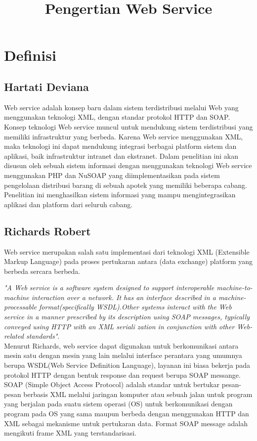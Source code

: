 \documentclass[12pt]{journal}
\begin{document}
\title{Pengertian Web Service}
\maketitle

\section{Definisi}

\subsection{Hartati Deviana}
	Web service adalah konsep baru dalam sistem terdistribusi melalui Web yang menggunakan teknologi XML, dengan standar protokol  HTTP dan SOAP. Konsep teknologi Web service muncul untuk mendukung sistem terdistribusi yang memiliki infrastruktur yang berbeda. Karena Web service menggunakan XML, maka teknologi ini dapat mendukung integrasi berbagai platform sistem dan aplikasi, baik infrastruktur intranet dan ekstranet. Dalam penelitian ini akan disusun oleh sebuah sistem informasi dengan menggunakan teknologi Web service menggunakan PHP dan NuSOAP yang diimplementasikan pada sistem pengelolaan distribusi barang di sebuah apotek yang memiliki beberapa cabang. Penelitian ini menghasilkan sistem informasi yang mampu mengintegrasikan aplikasi dan platform dari seluruh cabang\cite{deviana2013penerapan}.

\subsection{Richards Robert}

Web service merupakan salah satu implementasi dari teknologi XML (Extensible Markup Language) pada proses pertukaran antara (data exchange) platform yang berbeda sercara berbeda.

\textit{"A Web service is a software system designed to support interoperable machine-to-machine interaction over a network. It has an interface described in a machine-processable format(specifically WSDL).Other systems interact with the Web service in a manner prescribed by its description using SOAP messages, typically conveyed using HTTP with an XML seriali zation in conjunction with other Web-related standards"}.\\

Menurut Richards, web service dapat digunakan untuk berkomunikasi antara mesin satu dengan mesin yang lain melalui interface perantara yang umumnya berupa WSDL(Web Service Definition Language), layanan ini biasa bekerja pada protokol HTTP dengan bentuk response dan request berupa SOAP messange. SOAP (Simple Object Access Protocol) adalah standar untuk bertukar pesan-pesan berbasis XML melalui jaringan komputer atau sebuah jalan untuk program yang berjalan pada suatu sistem operasi (OS) untuk berkomunikasi dengan program pada OS yang sama maupun berbeda dengan menggunakan HTTP dan XML sebagai mekanisme untuk pertukaran data. Format SOAP message adalah mengikuti frame XML yang terstandarisasi\cite{ihya2011pembuatan}. 
\end{document}

